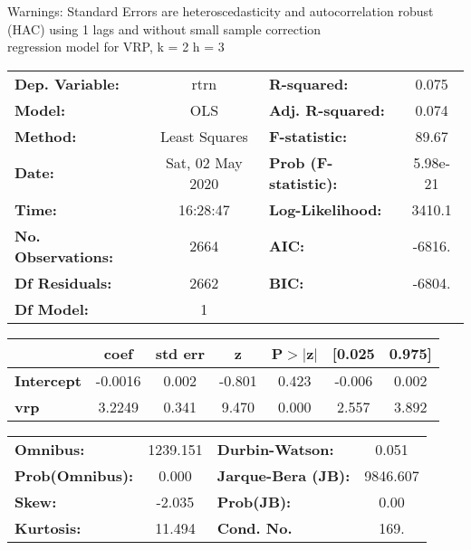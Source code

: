 Warnings: \newline
 [1] Standard Errors are heteroscedasticity and autocorrelation robust (HAC) using 1 lags and without small sample correction\\ 

regression model for VRP, k = 2 h = 3\begin{center}
\begin{tabular}{lclc}
\toprule
\textbf{Dep. Variable:}    &       rtrn       & \textbf{  R-squared:         } &     0.075   \\
\textbf{Model:}            &       OLS        & \textbf{  Adj. R-squared:    } &     0.074   \\
\textbf{Method:}           &  Least Squares   & \textbf{  F-statistic:       } &     89.67   \\
\textbf{Date:}             & Sat, 02 May 2020 & \textbf{  Prob (F-statistic):} &  5.98e-21   \\
\textbf{Time:}             &     16:28:47     & \textbf{  Log-Likelihood:    } &    3410.1   \\
\textbf{No. Observations:} &        2664      & \textbf{  AIC:               } &    -6816.   \\
\textbf{Df Residuals:}     &        2662      & \textbf{  BIC:               } &    -6804.   \\
\textbf{Df Model:}         &           1      & \textbf{                     } &             \\
\bottomrule
\end{tabular}
\begin{tabular}{lcccccc}
                   & \textbf{coef} & \textbf{std err} & \textbf{z} & \textbf{P$> |$z$|$} & \textbf{[0.025} & \textbf{0.975]}  \\
\midrule
\textbf{Intercept} &      -0.0016  &        0.002     &    -0.801  &         0.423        &       -0.006    &        0.002     \\
\textbf{vrp}       &       3.2249  &        0.341     &     9.470  &         0.000        &        2.557    &        3.892     \\
\bottomrule
\end{tabular}
\begin{tabular}{lclc}
\textbf{Omnibus:}       & 1239.151 & \textbf{  Durbin-Watson:     } &    0.051  \\
\textbf{Prob(Omnibus):} &   0.000  & \textbf{  Jarque-Bera (JB):  } & 9846.607  \\
\textbf{Skew:}          &  -2.035  & \textbf{  Prob(JB):          } &     0.00  \\
\textbf{Kurtosis:}      &  11.494  & \textbf{  Cond. No.          } &     169.  \\
\bottomrule
\end{tabular}
\end{center}

